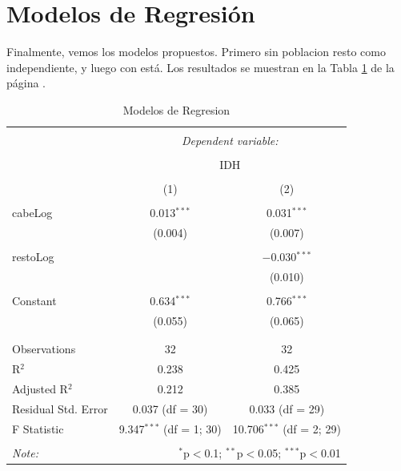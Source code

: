 \documentclass{article}
\begin{document}
\section{Modelos de Regresión}

Finalmente, vemos los modelos propuestos. Primero sin poblacion resto como independiente, y luego con está. Los resultados se muestran en la Tabla \ref{regresiones} de la página \pageref{regresiones}.



\begin{table}[!htbp] \centering 
  \caption{Modelos de Regresion} 
  \label{regresiones} 
\begin{tabular}{@{\extracolsep{5pt}}lcc} 
\\[-1.8ex]\hline 
\hline \\[-1.8ex] 
 & \multicolumn{2}{c}{\textit{Dependent variable:}} \\ 
\cline{2-3} 
\\[-1.8ex] & \multicolumn{2}{c}{IDH} \\ 
\\[-1.8ex] & (1) & (2)\\ 
\hline \\[-1.8ex] 
 cabeLog & 0.013$^{***}$ & 0.031$^{***}$ \\ 
  & (0.004) & (0.007) \\ 
  & & \\ 
 restoLog &  & $-$0.030$^{***}$ \\ 
  &  & (0.010) \\ 
  & & \\ 
 Constant & 0.634$^{***}$ & 0.766$^{***}$ \\ 
  & (0.055) & (0.065) \\ 
  & & \\ 
\hline \\[-1.8ex] 
Observations & 32 & 32 \\ 
R$^{2}$ & 0.238 & 0.425 \\ 
Adjusted R$^{2}$ & 0.212 & 0.385 \\ 
Residual Std. Error & 0.037 (df = 30) & 0.033 (df = 29) \\ 
F Statistic & 9.347$^{***}$ (df = 1; 30) & 10.706$^{***}$ (df = 2; 29) \\ 
\hline 
\hline \\[-1.8ex] 
\textit{Note:}  & \multicolumn{2}{r}{$^{*}$p$<$0.1; $^{**}$p$<$0.05; $^{***}$p$<$0.01} \\ 
\end{tabular} 
\end{table} 
\clearpage
\end{document}
